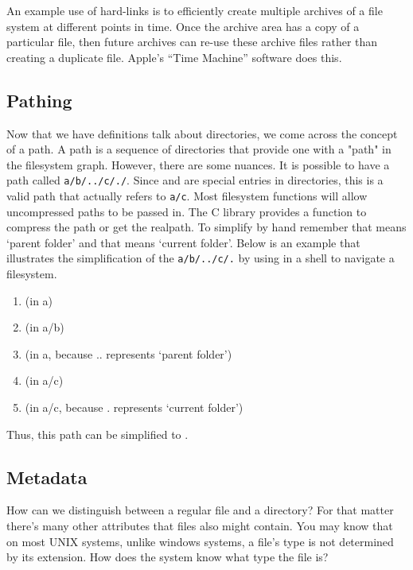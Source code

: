 An example use of hard-links is to efficiently create multiple archives of a file system at different points in time. Once the archive area has a copy of a particular file, then future archives can re-use these archive files rather than creating a duplicate file. Apple's ``Time Machine'' software does this.

\subsection{Pathing}

Now that we have definitions talk about directories, we come across the concept of a path. A path is a sequence of directories that provide one with a "path" in the filesystem graph. However, there are some nuances. It is possible to have a path called \texttt{a/b/../c/./}. Since  and  are special entries in directories, this is a valid path that actually refers to \texttt{a/c}. Most filesystem functions will allow uncompressed paths to be passed in. The C library provides a function  to compress the path or get the realpath. To simplify by hand remember that  means `parent folder' and that  means `current folder'. Below is an example that illustrates the simplification of the \texttt{a/b/../c/.} by using  in a shell to navigate a filesystem.

\begin{enumerate}
  \item {} (in a)
  \item {} (in a/b)
  \item {} (in a, because .. represents `parent folder')
  \item {} (in a/c)
  \item {} (in a/c, because . represents `current folder')
\end{enumerate}

Thus, this path can be simplified to .

\subsection{Metadata}

How can we distinguish between a regular file and a directory? For that matter there's many other attributes that files also might contain. You may know that on most UNIX systems, unlike windows systems, a file's type is not determined by its extension. How does the system know what type the file is?

